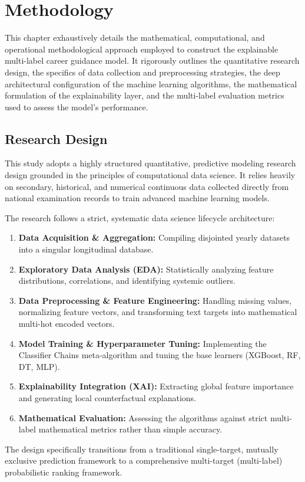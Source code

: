 \section{Methodology}

This chapter exhaustively details the mathematical, computational, and operational methodological approach employed to construct the explainable multi-label \parencite{tsoumakas2007multi} career guidance model. It rigorously outlines the quantitative research design, the specifics of data collection and preprocessing strategies, the deep architectural configuration of the machine learning algorithms, the mathematical formulation of the explainability layer, and the multi-label \parencite{tsoumakas2007multi} evaluation metrics used to assess the model's performance.

\subsection{Research Design}

This study adopts a highly structured quantitative, predictive modeling research design grounded in the principles of computational data science. It relies heavily on secondary, historical, and numerical continuous data collected directly from national examination records to train advanced machine learning models. 

The research follows a strict, systematic data science lifecycle architecture:
\begin{enumerate}
    \item \textbf{Data Acquisition \& Aggregation:} Compiling disjointed yearly datasets into a singular longitudinal database.
    \item \textbf{Exploratory Data Analysis (EDA):} Statistically analyzing feature distributions, correlations, and identifying systemic outliers.
    \item \textbf{Data Preprocessing \& Feature Engineering:} Handling missing values, normalizing feature vectors, and transforming text targets into mathematical multi-hot encoded vectors.
    \item \textbf{Model Training \& Hyperparameter Tuning:} Implementing the Classifier Chains \parencite{read2011classifier} meta-algorithm and tuning the base learners (XGBoost, RF, DT, MLP).
    \item \textbf{Explainability Integration (XAI):} Extracting global feature importance and generating local counterfactual \parencite{wachter2017counterfactual} explanations.
    \item \textbf{Mathematical Evaluation:} Assessing the algorithms against strict multi-label \parencite{tsoumakas2007multi} mathematical metrics rather than simple accuracy.
\end{enumerate}
The design specifically transitions from a traditional single-target, mutually exclusive prediction framework to a comprehensive multi-target (multi-label) probabilistic ranking framework.

